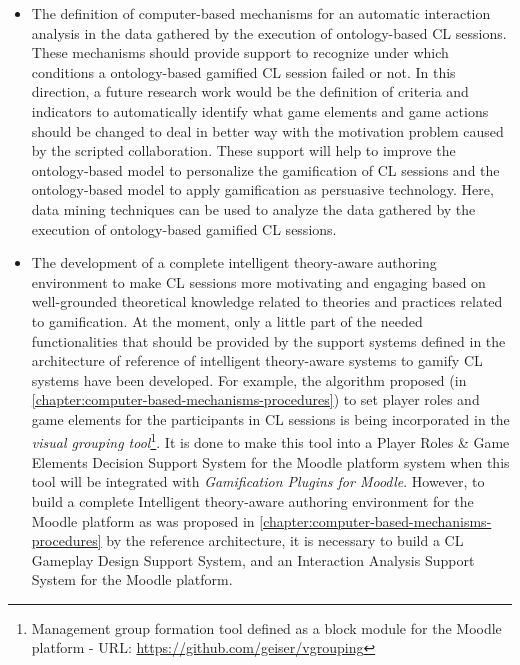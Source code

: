\begin{itemize}
\item The definition of computer-based mechanisms for an automatic interaction analysis in the data gathered by the execution of ontology-based CL sessions. These mechanisms should provide support to recognize under which conditions a ontology-based gamified CL session failed or not. In this direction, a future research work would be the definition of criteria and indicators to automatically identify what game elements and game actions should be changed to deal in better way with the motivation problem caused by the scripted collaboration. These support will help to improve the ontology-based model to personalize the gamification of CL sessions and the ontology-based model to apply gamification as persuasive technology. Here, data mining techniques can be used to analyze the data gathered by the execution of ontology-based gamified CL sessions.

\item The development of a complete intelligent theory-aware authoring environment to make CL sessions more motivating and engaging based on well-grounded theoretical knowledge related to theories and practices related to gamification. At the moment, only a little part of the needed functionalities that should be provided by the support systems defined in the architecture of reference of intelligent theory-aware systems to gamify CL systems have been developed. For example, the algorithm proposed (in \autoref{chapter:computer-based-mechanisms-procedures}) to set player roles and game elements for the participants in CL sessions is being incorporated in the \emph{visual grouping tool}\footnote{Management group formation tool defined as a block module for the Moodle platform - URL: \url{https://github.com/geiser/vgrouping}}. It is done to make this tool into a Player Roles \& Game Elements Decision Support System for the Moodle platform system when this tool will be integrated with \emph{Gamification Plugins for Moodle}. However, to build a complete Intelligent theory-aware authoring environment for the Moodle platform as was proposed in \autoref{chapter:computer-based-mechanisms-procedures} by the reference architecture, it is necessary to build a CL Gameplay Design Support System, and an Interaction Analysis Support System for the Moodle platform.
\end{itemize}

